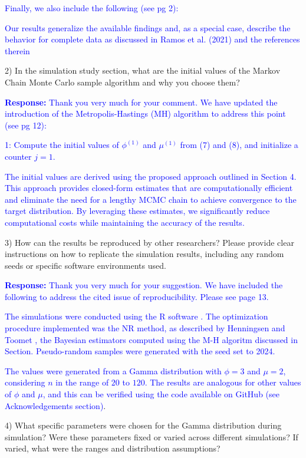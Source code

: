 \documentclass[12pt]{article}
\begin{document}
\textcolor{blue}{Finally, we also include the following (see pg 2):}

\textcolor{blue}{Our results generalize the available findings and, as a special case, describe the behavior for complete data as discussed in Ramos et al. (2021) and the references therein}

2) In the simulation study section, what are the initial values of the Markov Chain Monte Carlo sample algorithm and why you choose them?

\textcolor{blue}{\textbf{Response:} Thank you very much for your comment. We have updated the introduction of the Metropolis-Hastings (MH) algorithm to address this point (see pg 12):}

\textcolor{blue}{1: Compute the initial values of $\phi^{(1)}$ and $\mu^{(1)}$ from (7) and (8), and initialize a counter $j = 1$.}

\textcolor{blue}{The initial values are derived using the proposed approach outlined in Section 4. This approach provides closed-form estimates that are computationally efficient and eliminate the need for a lengthy MCMC chain to achieve convergence to the target distribution. By leveraging these estimates, we significantly reduce computational costs while maintaining the accuracy of the results.}

3) How can the results be reproduced by other researchers? Please provide clear instructions on how to replicate the simulation results, including any random seeds or specific software environments used.

\textcolor{blue}{\textbf{Response:} Thank you very much for your suggestion. We have included the following to address the cited issue of reproducibility. Please see page 13.}


\textcolor{blue}{The simulations were conducted using the R software \cite{rsoftware20024}. The optimization procedure implemented was the NR method, as described by Henningsen and Toomet \cite{henningsen2011maxlik}, the Bayesian estimators computed using the M-H algoritm discussed in Section. Pseudo-random samples were generated with the seed set to 2024.}

\textcolor{blue}{The values were generated from a Gamma distribution with $\phi=3$ and $\mu=2$, considering $n$ in the range of $20$ to $120$. The results are analogous for other values of $\phi$ and $\mu$, and this can be verified using the code available on GitHub (see Acknowledgements section)}. 


4) What specific parameters were chosen for the Gamma distribution during simulation? Were these parameters fixed or varied across different simulations? If varied, what were the ranges and distribution assumptions?
\end{document}
